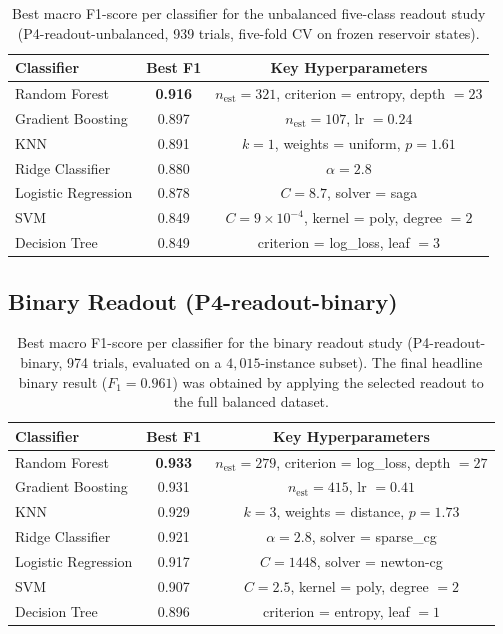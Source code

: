 \documentclass[journal=asbcd6,manuscript=suppinfo]{achemso}
\begin{document}
\begin{table}[H]
    \centering
    \caption{Best macro F1-score per classifier for the unbalanced five-class readout study (P4-readout-unbalanced, 939 trials, five-fold CV on frozen reservoir states).}
    \label{tab:P4-readout-unbalanced}
    \small
    \begin{tabular}{lcc}
        \toprule
        Classifier & Best F1 & Key Hyperparameters \\
        \midrule
        Random Forest & \textbf{0.916} & $n_{\mathrm{est}} = 321$, criterion = entropy, depth $= 23$ \\
        Gradient Boosting & 0.897 & $n_{\mathrm{est}} = 107$, lr $= 0.24$ \\
        KNN & 0.891 & $k = 1$, weights = uniform, $p = 1.61$ \\
        Ridge Classifier & 0.880 & $\alpha = 2.8$ \\
        Logistic Regression & 0.878 & $C = 8.7$, solver = saga \\
        SVM & 0.849 & $C = 9 \times 10^{-4}$, kernel = poly, degree $= 2$ \\
        Decision Tree & 0.849 & criterion = log\_loss, leaf $= 3$ \\
        \bottomrule
    \end{tabular}
\end{table}

\subsection{Binary Readout (P4-readout-binary)}

\begin{table}[H]
    \centering
    \caption{Best macro F1-score per classifier for the binary readout study (P4-readout-binary, 974 trials, evaluated on a $4{,}015$-instance subset). 
    The final headline binary result ($F_1 = 0.961$) was obtained by applying the selected readout to the full balanced dataset.}
    \label{tab:P4-readout-binary}
    \small
    \begin{tabular}{lcc}
        \toprule
        Classifier & Best F1 & Key Hyperparameters \\
        \midrule
        Random Forest & \textbf{0.933} & $n_{\mathrm{est}} = 279$, criterion = log\_loss, depth $= 27$ \\
        Gradient Boosting & 0.931 & $n_{\mathrm{est}} = 415$, lr $= 0.41$ \\
        KNN & 0.929 & $k = 3$, weights = distance, $p = 1.73$ \\
        Ridge Classifier & 0.921 & $\alpha = 2.8$, solver = sparse\_cg \\
        Logistic Regression & 0.917 & $C = 1448$, solver = newton-cg \\
        SVM & 0.907 & $C = 2.5$, kernel = poly, degree $= 2$ \\
        Decision Tree & 0.896 & criterion = entropy, leaf $= 1$ \\
        \bottomrule
    \end{tabular}
\end{table}
\end{document}
